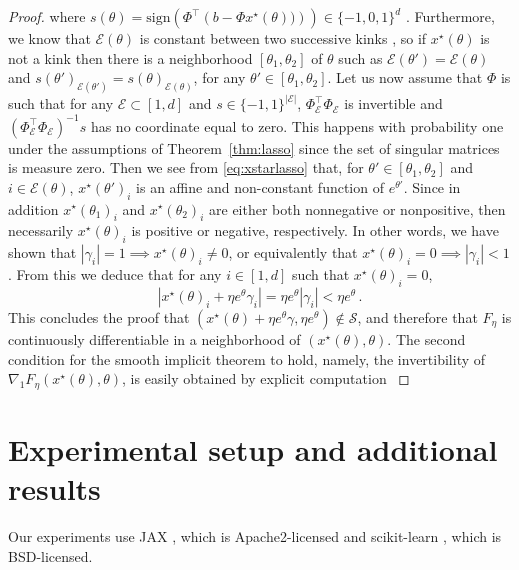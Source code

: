 \documentclass{article}
\def\cS{{\mathcal{S}}}
\def\cE{{\mathcal{E}}}
\def\sign{{\text{sign}}}
\def\dataMatrix{\Phi}
\begin{document}
\begin{proof}
where $s(\theta) = \sign(\dataMatrix^\top\left(b-\dataMatrix x^\star(\theta) )\right)) \in \{-1,0,1\}^d$ \cite{Tibshirani2013lasso}. Furthermore, we know that $\cE(\theta)$ is constant between two successive kinks \cite{Mairal12Complexity}, so if $x^\star(\theta)$ is not a kink then there is a neighborhood $[\theta_1,\theta_2]$ of $\theta$ such as $\cE(\theta')=\cE(\theta)$ and $s(\theta')_{\cE(\theta')}=s(\theta)_{\cE(\theta)}$, for any $\theta'\in[\theta_1,\theta_2]$. Let us now assume that $\dataMatrix$ is such that for any $\cE \subset [1,d]$ and $s\in\{-1,1\}^{|\cE|}$, $\dataMatrix_\cE^\top \dataMatrix_\cE$ is invertible and $(\dataMatrix_\cE^\top \dataMatrix_\cE)^{-1}s$ has no coordinate equal to zero. This happens with probability one under the assumptions of Theorem~\ref{thm:lasso} since the set of singular matrices is measure zero. Then we see from \eqref{eq:xstarlasso} that, for $\theta'\in[\theta_1 , \theta_2]$ and $i\in\cE(\theta)$, $x^\star(\theta')_i$ is an affine and non-constant function of $e^{\theta'}$. Since in addition $x^\star(\theta_1)_i$ and $x^\star(\theta_2)_i$ are either both nonnegative or nonpositive, then necessarily $x^\star(\theta)_i$ is positive or negative, respectively. In other words, we have shown that $|\gamma_i|=1 \implies x^\star(\theta)_i \neq 0$, or equivalently that $x^\star(\theta)_i = 0 \implies |\gamma_i|<1$. From this we deduce that for any $i\in[1,d]$ such that $x^\star(\theta)_i = 0$,
    $$
    |x^\star(\theta)_i + \eta e^\theta \gamma_i| = \eta e^\theta |\gamma_i| < \eta e^\theta\,.
    $$
This concludes the proof that $(x^\star(\theta) + \eta e^\theta \gamma,\eta e^\theta) \notin \cS$, and therefore that $F_\eta$ is continuously differentiable in a neighborhood of $(x^\star(\theta),\theta)$. The second condition for the smooth implicit theorem to hold, namely, the invertibility of $\nabla_1 F_\eta(x^\star(\theta),\theta)$, is easily obtained by explicit computation \cite[Proposition 1]{bertrand_2020_implicit,bertrand_2021_journal}
\end{proof}




\section{Experimental setup and additional results}
\label{appendix:experimental_setup_and_additional_results}

Our experiments use JAX \cite{jax}, which is Apache2-licensed and
scikit-learn \cite{scikit-learn}, which is BSD-licensed.
\end{document}
